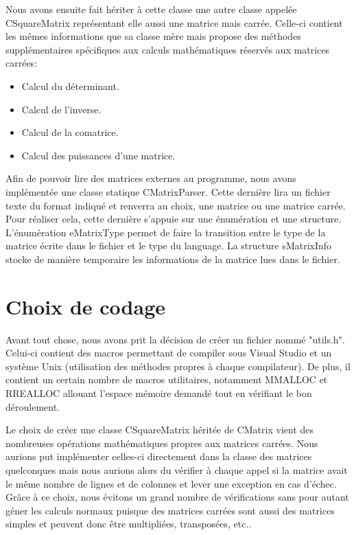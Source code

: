		Nous avons ensuite fait hériter à cette classe une autre classe appelée CSquareMatrix représentant elle aussi une matrice mais carrée. Celle-ci contient les mêmes informations que sa classe mère mais propose des méthodes supplémentaires spécifiques aux calculs mathématiques réservés aux matrices carrées:
		\begin{itemize}
			\item Calcul du déterminant.
			\item Calcul de l'inverse.
			\item Calcul de la comatrice.
			\item Calcul des puissances d'une matrice.\\
		\end{itemize}
		
		Afin de pouvoir lire des matrices externes au programme, nous avons implémentée une classe statique CMatrixParser. Cette dernière lira un fichier texte du format indiqué et renverra au choix, une matrice ou une matrice carrée. Pour réaliser cela, cette dernière s'appuie sur une énumération et une structure. L'énumération eMatrixType permet de faire la transition entre le type de la matrice écrite dans le fichier et le type du language. La structure sMatrixInfo stocke de manière temporaire les informations de la matrice lues dans le fichier. 
		
		
	\chapter{Choix de codage}
		Avant tout chose, nous avons prit la décision de créer un fichier nommé "utils.h". Celui-ci contient des macros permettant de compiler sous Visual Studio et un système Unix (utilisation des méthodes propres à chaque compilateur). De plus, il contient un certain nombre de macros utilitaires, notamment MMALLOC et RREALLOC allouant l'espace mémoire demandé tout en vérifiant le bon déroulement.
	
		Le choix de créer une classe CSquareMatrix héritée de CMatrix vient des nombreuses opérations mathématiques propres aux matrices carrées. Nous aurions put implémenter celles-ci directement dans la classe des matrices quelconques mais nous aurions alors du vérifier à chaque appel si la matrice avait le même nombre de lignes et de colonnes et lever une exception en cas d'échec.
		Grâce à ce choix, nous évitons un grand nombre de vérifications sans pour autant géner les calculs normaux puisque des matrices carrées sont aussi des matrices simples et peuvent donc être multipliées, transposées, etc..
		
